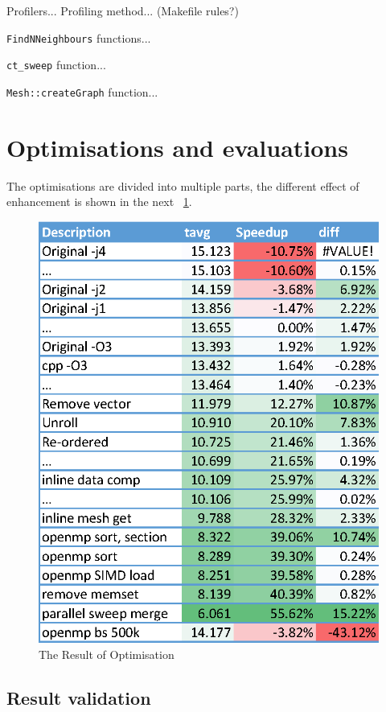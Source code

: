 \documentclass[conference]{IEEEtran}
\newcommand{\fref}[1]{\figurename~\ref{#1}}
\begin{document}
Profilers... Profiling method... (Makefile rules?)

\texttt{FindNNeighbours} functions...

\texttt{ct\_sweep} function...

\texttt{Mesh::createGraph} function...

\section{Optimisations and evaluations}
The optimisations are divided into multiple parts, the different effect of enhancement is shown in the next \fref{fig:log}. 
\begin{figure}[!ht]
	\centering
	\includegraphics[width=\columnwidth]{data_log}
	\caption{The Result of Optimisation}
	\label{fig:log}
\end{figure}


\subsection{Result validation}
\end{document}
